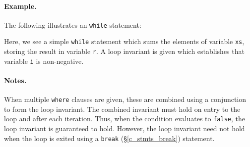 \paragraph{Example.} The following illustrates an \lstinline{while} statement:



Here, we see a simple \lstinline{while} statement which sums the elements of variable \lstinline{xs}, storing the result in variable \lstinline{r}.  A loop invariant is given which establishes that variable \lstinline{i} is non-negative.

\paragraph{Notes.}   When multiple \lstinline{where} clauses are given, these are combined using a conjunction to form the loop invariant.  The combined invariant must hold on entry to the loop and after each iteration.  Thus, when the condition evaluates to \lstinline{false}, the loop invariant is guaranteed to hold.  However, the loop invariant need not hold when the loop is exited using a \lstinline{break} (\S\ref{c_stmts_break}) statement.





